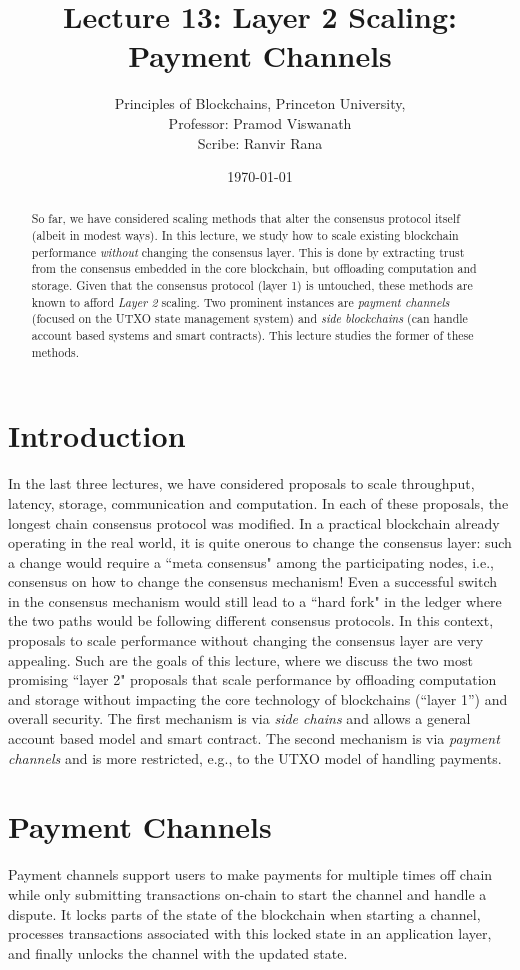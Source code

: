 \documentclass{article}
\title{Lecture 13:   Layer 2 Scaling: Payment Channels}
\author{
Principles of Blockchains, Princeton University, \\ 
Professor: Pramod Viswanath \\ 
Scribe: Ranvir Rana\\
}
\date{\today}
\begin{document}
\maketitle

\begin{abstract}
    So far, we have considered scaling methods that alter the consensus protocol itself (albeit in modest ways). In this lecture, we study how to scale existing blockchain performance {\em without} changing the consensus layer. This is done  by extracting trust from the  consensus embedded in the core blockchain, but offloading computation and storage. Given that the consensus protocol (layer 1) is untouched, these methods are known to afford {\em Layer 2} scaling. Two prominent instances are  {\em payment channels} (focused on the UTXO state management system) and {\em side blockchains} (can handle account based systems and smart contracts). This lecture studies the former of these methods.
\end{abstract}



\section*{Introduction}
In the last three lectures, we have considered proposals to scale throughput, latency, storage, communication and computation. In each of these proposals, the longest chain consensus protocol was modified. In a practical blockchain already operating in the real world, it is quite onerous to change the consensus layer: such a change would require a ``meta consensus" among the participating nodes, i.e., consensus on how to change the consensus mechanism! Even a successful switch in the consensus mechanism would still lead to a ``hard fork" in the ledger where the two paths would be following different consensus protocols. In this context, proposals to scale performance without changing the consensus layer are very appealing. Such are the goals of this lecture, where we discuss the two most promising ``layer 2"  proposals that scale performance by offloading computation and storage  without impacting the core technology of blockchains (``layer 1'') and overall security. The first mechanism is via {\em side chains} and allows a general account based model and smart contract. The second mechanism is via {\em payment channels} and is more restricted, e.g., to the UTXO model of handling payments.  



\section*{Payment Channels}
Payment channels support users to make payments for multiple times off chain while only submitting transactions on-chain to start the channel and handle a dispute. It locks parts of the state of the blockchain when starting a channel, processes transactions associated with this locked state in an application layer, and finally unlocks the channel with the updated state.
\end{document}
